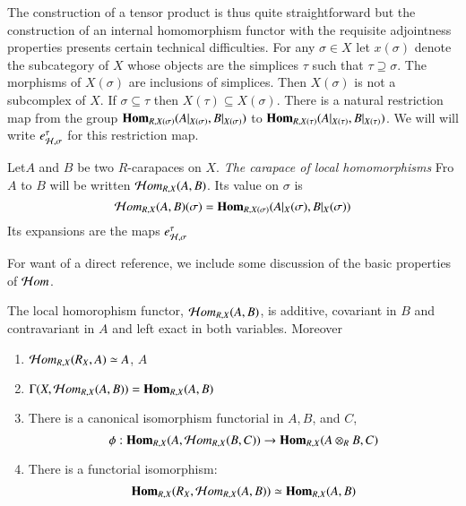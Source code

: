 The construction of a tensor product is thus quite straightforward but the construction of an internal homomorphism functor with the requisite adjointness properties presents certain technical difficulties. For any $\sigma \in X$ let $x(\sigma)$ denote the subcategory of $X$ whose objects are the simplices $\tau$ such that $\tau \supseteq \sigma$. The morphisms of $X(\sigma)$ are inclusions of simplices. Then $X(\sigma)$ is not a subcomplex of $X$. If $\sigma \subseteq \tau$ then $X(\tau) \subseteq X(\sigma)$. There is a natural restriction map from the group $\operatorname{\mathbf{Hom}}_{R, X (\sigma)}(A|_{X(\sigma)}, B|_{X(\sigma)})$ to $\operatorname{\mathbf{Hom}}_{R, X(\tau)}(A|_{X(\tau)}, B|_{X(\tau)})$. We will will write $e_{\mathcal{H}, \sigma}^{\tau}$ for this restriction map.

\begin{definition}\label{chap6-definition-2.3}
Let\pageoriginale $A$ and $B$ be two $R$-carapaces on $X$. \textit{The carapace of local homomorphisms} Fro  $A$ to $B$ will be written $\mathcal{H} om_{R, X}(A, B)$. Its value on $\sigma$ is
$$
\mathcal{H} om_{R, X}(A, B)(\sigma) = \operatorname{\mathbf{Hom}}_{R, X(\sigma)}(A|_{X}(\sigma), B|_{X}(\sigma))
$$
Its expansions are the maps $e_{\mathcal{H}, \sigma}^{\tau}$
\end{definition}

For want of a direct reference, we include some discussion of the basic properties of $\mathcal{H} om$.

\begin{secthm}\label{chap6-thm-2.4}
The local homorophism functor, $\mathcal{H} om_{R, X}(A, B)$, is additive, covariant in $B$ and contravariant in $A$ and left exact in both variables. Moreover
    \begin{enumerate}[(1)]
    \item $\mathcal{H} om_{R, X}(R_{X}, A)\simeq A$,  $A$\label{chap6-thm2.4-enum-(1)}
    \item $\Gamma(X, \mathcal{H} om_{R,X}(A, B)) = \operatorname{\mathbf{Hom}}_{R,X}(A, B)$\label{chap6-thm2.4-enum-(2)}
    \item There is a canonical isomorphism functorial in $A, B$, and $C$,\label{chap6-thm2.4-enum-(3)}
        $$
        \phi : \operatorname{\mathbf{Hom}}_{R, X}(A, \mathcal{H} om_{R, X}(B, C))\rightarrow \operatorname{\mathbf{Hom}}_{R, X}(A \otimes_{R} B, C)
        $$
    \item There is a functorial isomorphism:\label{chap6-thm2.4-enum-(4)}
    $$
    \operatorname{\mathbf{Hom}}_{R, X}(R_{X}, \mathcal{H} om_{R, X}(A, B)) \simeq \operatorname{\mathbf{Hom}}_{R, X}(A, B)
    $$  
    \end{enumerate}
\end{secthm}

